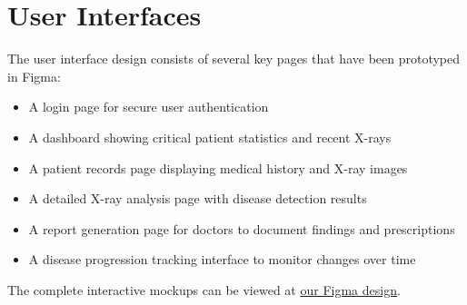 \documentclass[12pt, titlepage]{article}
\begin{document}

\newpage
\section{User Interfaces}
The user interface design consists of several key pages that have been prototyped in Figma:

\begin{itemize}
\item A login page for secure user authentication
\item A dashboard showing critical patient statistics and recent X-rays
\item A patient records page displaying medical history and X-ray images
\item A detailed X-ray analysis page with disease detection results
\item A report generation page for doctors to document findings and prescriptions
\item A disease progression tracking interface to monitor changes over time
\end{itemize}

The complete interactive mockups can be viewed at \href{https://www.figma.com/design/HAjX8dhwPjPSzX2Wz06YQ2/Capstone-App?node-id=134-122&t=8ET1qlba7wlarEvq-0}{our Figma design}.
\end{document}
